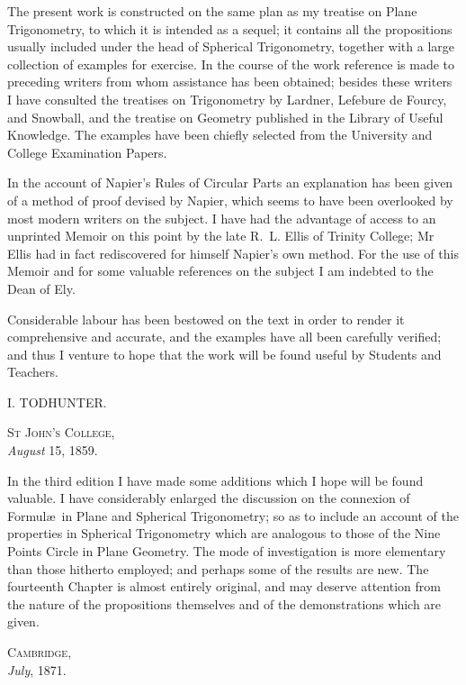 \documentclass{book}[2004/02/16]
\begin{document}
\begin{frontmatter}
The present work is constructed on the same plan as my
treatise on Plane Trigonometry, to which it is intended as a
sequel; it contains all the propositions usually included under
the head of Spherical Trigonometry, together with a large
collection of examples for exercise. In the course of the work
reference is made to preceding writers from whom assistance
has been obtained; besides these writers I have consulted the
treatises on Trigonometry by Lardner, Lefebure de Fourcy,
and Snowball, and the treatise on Geometry published in the
Library of Useful Knowledge. The examples have been
chiefly selected from the University and College Examination
Papers.

In the account of Napier's Rules of Circular Parts an
explanation has been given of a method of proof devised by
Napier, which seems to have been overlooked by most modern
writers on the subject. I have had the advantage of access to
an unprinted Memoir on this point by the late R.~L. Ellis of
Trinity College; Mr Ellis had in fact rediscovered for himself
Napier's own method. For the use of this Memoir and for
some valuable references on the subject I am indebted to the
Dean of Ely.

Considerable labour has been bestowed on the text in
order to render it comprehensive and accurate, and the examples
have all been carefully verified; and thus I venture
to hope that the work will be found useful by Students and
Teachers.

\begin{flushright}
{\large I. TODHUNTER. \mbox\qquad}
\end{flushright}

\begin{small}
\textsc{St John's College,}\\
\mbox{\hspace{5em}}\textit{August} 15, 1859.
\end{small}
\newpage

In the third edition I have made some additions which I
hope will be found valuable. I have considerably enlarged
the discussion on the connexion of Formul\ae\ in Plane and
Spherical Trigonometry; so as to include an account of the
properties in Spherical Trigonometry which are analogous to
those of the Nine Points Circle in Plane Geometry. The
mode of investigation is more elementary than those hitherto
employed; and perhaps some of the results are new. The
fourteenth Chapter is almost entirely original, and may deserve
attention from the nature of the propositions themselves
and of the demonstrations which are given.
\bigskip

\begin{small}
\textsc{Cambridge},\\
\mbox{\hspace{5em}}\textit{July}, 1871.
\end{small}



\tableofcontents
\end{frontmatter}
\end{document}
